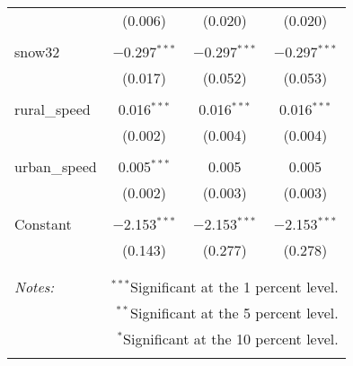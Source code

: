 \documentclass{article}
\begin{document}
\begin{table}[!htbp]
\begin{tabular}{@{\extracolsep{5pt}}lccc}
  & (0.006) & (0.020) & (0.020) \\ 
  & & & \\ 
 snow32 & $-$0.297$^{***}$ & $-$0.297$^{***}$ & $-$0.297$^{***}$ \\ 
  & (0.017) & (0.052) & (0.053) \\ 
  & & & \\ 
 rural\_speed & 0.016$^{***}$ & 0.016$^{***}$ & 0.016$^{***}$ \\ 
  & (0.002) & (0.004) & (0.004) \\ 
  & & & \\ 
 urban\_speed & 0.005$^{***}$ & 0.005 & 0.005 \\ 
  & (0.002) & (0.003) & (0.003) \\ 
  & & & \\ 
 Constant & $-$2.153$^{***}$ & $-$2.153$^{***}$ & $-$2.153$^{***}$ \\ 
  & (0.143) & (0.277) & (0.278) \\ 
  & & & \\ 
\hline 
\hline \\[-1.8ex] 
\textit{Notes:} & \multicolumn{3}{r}{$^{***}$Significant at the 1 percent level.} \\ 
 & \multicolumn{3}{r}{$^{**}$Significant at the 5 percent level.} \\ 
 & \multicolumn{3}{r}{$^{*}$Significant at the 10 percent level.} \\ 
\normalsize 
\end{tabular} 
\end{table} 
\end{document}
